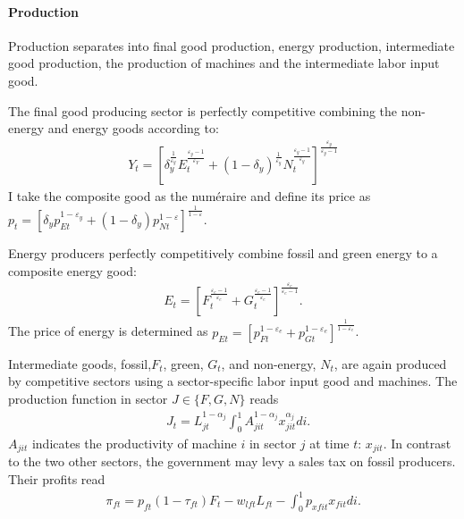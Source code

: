 
\paragraph{Production}
Production separates into final good production, energy production, intermediate good production, the production of machines and the intermediate labor input good. 

The final good producing sector is perfectly competitive combining the non-energy and energy goods according to:
\begin{align}
Y_t=\left[\delta_y^\frac{1}{\varepsilon_y}E_{t}^{\frac{\varepsilon_y-1}{\varepsilon_Y}}+(1-\delta_y)^\frac{1}{\varepsilon_y}N_{t}^{\frac{\varepsilon_y-1}{\varepsilon_y}}\right]^\frac{\varepsilon_y}{\varepsilon_y-1}
\end{align} 
I take the composite good as the numéraire and define its price as $p_t=\left[\delta_yp_{Et}^{1-\varepsilon_y}+(1-\delta_y)p_{Nt}^{1-\varepsilon}\right]^{\frac{1}{1-\varepsilon}}$.

Energy producers perfectly competitively combine fossil and green energy to a composite energy good:
\begin{align}
E_t=\left[F_t^\frac{\varepsilon_e-1}{\varepsilon_e}+G_t^\frac{\varepsilon_e-1}{\varepsilon_e}\right]^\frac{\varepsilon_e}{\varepsilon_e-1}.
\end{align}
The price of energy is determined as  $p_{Et}= \left[p_{Ft}^{1-\varepsilon_e}+p_{Gt}^{1-\varepsilon_e}\right]^\frac{1}{{1-\varepsilon_e}}$.

Intermediate goods, fossil,$F_t$, green, $G_t$, and non-energy, $N_t$, are again produced by competitive sectors using a sector-specific labor input good and machines. The production function in sector $J\in \{F,G,N\}$ reads
\begin{align}
&J_{t}= L_{jt}^{1-\alpha_j}\int_{0}^{1}A_{jit}^{1-\alpha_j}x_{jit}^{\alpha_j} di.
\end{align}
$A_{jit}$ indicates the productivity of machine $i$ in sector $j$ at time $t$: $x_{jit}$. In contrast to the two other sectors, the government may levy a sales tax on fossil producers. Their profits read
\begin{align}
\pi_{ft}=p_{ft}(1-\tau_{ft})F_t-w_{lft}L_{ft}-\int_{0}^{1}p_{xfit}x_{fit}di.
\end{align}

